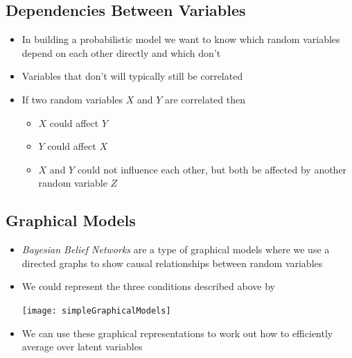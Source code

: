 
\begin{slide}
\section{Dependencies Between Variables}

\begin{PauseHighLight}
  \begin{itemize}
  \item In building a probabilistic model we want to know which random
    variables depend on each other directly and which don't\pause
  \item Variables that don't will typically still be correlated\pause
  \item If two random variables $X$ and $Y$ are correlated then
    \begin{itemize}
    \item $X$ could affect $Y$
    \item $Y$ could affect $X$
    \item $X$ and $Y$ could not influence each other, but both be
      affected by another random variable $Z$\pause
    \end{itemize}
  \end{itemize}
\end{PauseHighLight}

\end{slide}


\begin{slide}
\section{Graphical Models}

\begin{PauseHighLight}
  \begin{itemize}
  \item \emph{Bayesian Belief Networks} are a type of graphical models
    where we use a directed graphs to show causal relationships
    between random variables\pause
  \item We could represent the three conditions described above by
    \begin{center}
      \texttt{[image: simpleGraphicalModels]}\pause
    \end{center}
  \item We can use these graphical representations to work out how to
    efficiently average over latent variables\pause
  \end{itemize}
\end{PauseHighLight}

\end{slide}

